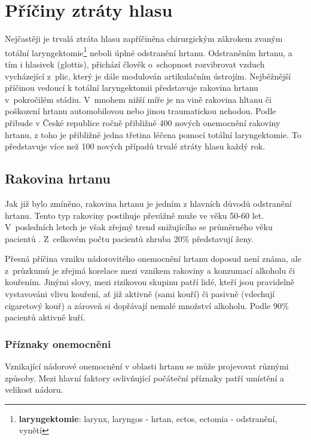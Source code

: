 \section{Příčiny ztráty hlasu}
\label{sec:cause:desease}

Nejčastěji je trvalá ztráta hlasu zapříčiněna chirurgickým zákrokem zvaným
totální laryngektomie\footnote{\textbf{laryngektomie}: larynx, laryngos -
hrtan, ectos, ectomia - odstranění, vynětí} neboli úplné odstranění hrtanu.
Odstraněním hrtanu, a tím i hlasivek (glottis), přichází člověk o~schopnost
rozvibrovat vzduch vycházející z~plic, který je dále modulován artikulačním
ústrojím. Nejběžnější příčinou vedoucí k totální laryngektomii představuje
rakovina hrtanu v~pokročilém stádiu. V~mnohem nižší míře je na vině rakovina
hltanu či poškození hrtanu automobilovou nebo jinou traumatickou nehodou.
Podle \cite{Slavicek2000} přibude v České republice ročně přibližně 400 nových
onemocnění rakoviny hrtanu, z toho je přibližně jedna třetina léčena pomocí
totální laryngektomie. To představuje více než 100 nových případů trvalé
ztráty hlasu každý rok.

\subsection{Rakovina hrtanu} %
\label{sub:cause:desease:cancer}

Jak již bylo zmíněno, rakovina hrtanu je jedním z hlavních důvodů odstranění
hrtanu. Tento typ rakoviny postihuje převážně muže ve věku 50-60 let.
V~posledních letech je však zřejmý trend snižujícího se průměrného věku
pacientů \cite{Skvrnakova2010}. Z~celkovém počtu pacientů zhruba 20\%
představují ženy.

Přesná příčina vzniku nádorovitého onemocnění hrtanu doposud není známa, ale
z~průzkumů je zřejmá korelace mezi vznikem rakoviny a konzumací alkoholu či
kouřením. Jinými slovy, mezi rizikovou skupinu patří lidé, kteří jsou
pravidelně vystavováni vlivu kouření, ať již aktivně (sami kouří) či pasivně
(vdechují cigaretový kouř) a zároveň si dopřávají nemalé množství alkoholu.
Podle \cite{Skvrnakova2010} 90\% pacientů aktivně kuří.

\subsubsection{Příznaky onemocněni} %
\label{ssub:cause:desease:cancer:symptom}

Vznikající nádorové onemocnění v oblasti hrtanu se může projevovat různými
způsoby. Mezi hlavní faktory ovlivňující počáteční příznaky patří umístění a
velikost nádoru.

